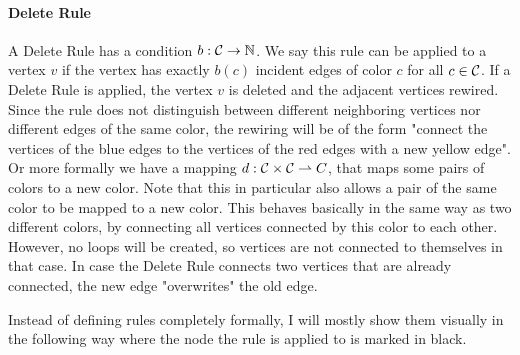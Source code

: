 \paragraph*{Delete Rule} A Delete Rule has a condition $b : \mathcal{C} \to \mathbb{N}$.
We say this rule can be applied to a vertex $v$ if the vertex has exactly $b(c)$ incident edges of color $c$ for all $c \in \mathcal{C}$.
If a Delete Rule is applied, the vertex $v$ is deleted and the adjacent vertices rewired.
Since the rule does not distinguish between different neighboring vertices nor different edges of the same color, the rewiring will be of the form "connect the vertices of the blue edges to the vertices of the red edges with a new yellow edge".
Or more formally we have a mapping $d: \mathcal{C} \times \mathcal{C} \rightharpoonup C$, that maps some pairs of colors to a new color.
Note that this in particular also allows a pair of the same color to be mapped to a new color.
This behaves basically in the same way as two different colors, by connecting all vertices connected by this color to each other.
However, no loops will be created, so vertices are not connected to themselves in that case.
In case the Delete Rule connects two vertices that are already connected, the new edge "overwrites" the old edge.

Instead of defining rules completely formally, I will mostly show them visually in the following way where the node the rule is applied to is marked in black.

\begin{center}
\end{center}

